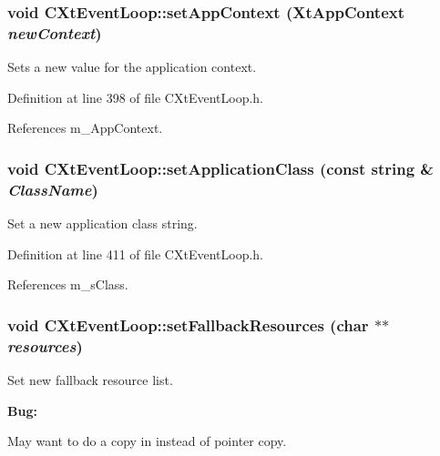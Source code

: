\subsubsection{\setlength{\rightskip}{0pt plus 5cm}void CXt\-Event\-Loop::set\-App\-Context (Xt\-App\-Context {\em new\-Context})\hspace{0.3cm}{\tt  [inline, protected]}}\label{classCXtEventLoop_b1}


Sets a new value for the application context.



Definition at line 398 of file CXt\-Event\-Loop.h.

References m\_\-App\-Context.
\subsubsection{\setlength{\rightskip}{0pt plus 5cm}void CXt\-Event\-Loop::set\-Application\-Class (const string \& {\em Class\-Name})\hspace{0.3cm}{\tt  [inline, protected]}}\label{classCXtEventLoop_b4}


Set a new application class string.



Definition at line 411 of file CXt\-Event\-Loop.h.

References m\_\-s\-Class.
\subsubsection{\setlength{\rightskip}{0pt plus 5cm}void CXt\-Event\-Loop::set\-Fallback\-Resources (char $\ast$$\ast$ {\em resources})\hspace{0.3cm}{\tt  [inline, protected]}}\label{classCXtEventLoop_b3}


Set new fallback resource list.

\begin{Desc}
\item[{\bf Bug: }]\par
 May want to do a copy in instead of pointer copy.\end{Desc}
 

